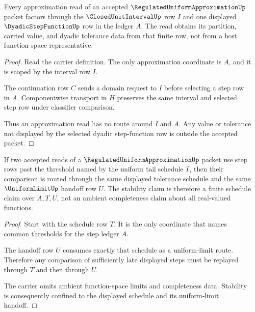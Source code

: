 \begin{theorem}
\label{thm:regulated-uniform-approximation-step-ledger-exactness}
Every approximation read of an accepted $\RegulatedUniformApproximationUp$ packet factors through the $\ClosedUnitIntervalUp$ row $I$ and one displayed $\DyadicStepFunctionUp$ row in the ledger $A$. The read obtains its partition, carried value, and dyadic tolerance data from that finite row, not from a host function-space representative.
\end{theorem}
\begin{proof}
Read the carrier definition. The only approximation coordinate is $A$, and it is scoped by the interval row $I$.

The continuation row $C$ sends a domain request to $I$ before selecting a step row in $A$. Componentwise transport in $H$ preserves the same interval and selected step row under classifier comparison.

Thus an approximation read has no route around $I$ and $A$. Any value or tolerance not displayed by the selected dyadic step-function row is outside the accepted packet.
\end{proof}

\begin{theorem}
\label{thm:regulated-uniform-approximation-uniform-stability}
If two accepted reads of a $\RegulatedUniformApproximationUp$ packet use step rows past the threshold named by the uniform tail schedule $T$, then their comparison is routed through the same displayed tolerance schedule and the same $\UniformLimitUp$ handoff row $U$. The stability claim is therefore a finite schedule claim over $A,T,U$, not an ambient completeness claim about all real-valued functions.
\end{theorem}
\begin{proof}
Start with the schedule row $T$. It is the only coordinate that names common thresholds for the step ledger $A$.

The handoff row $U$ consumes exactly that schedule as a uniform-limit route. Therefore any comparison of sufficiently late displayed steps must be replayed through $T$ and then through $U$.

The carrier omits ambient function-space limits and completeness data. Stability is consequently confined to the displayed schedule and its uniform-limit handoff.
\end{proof}

